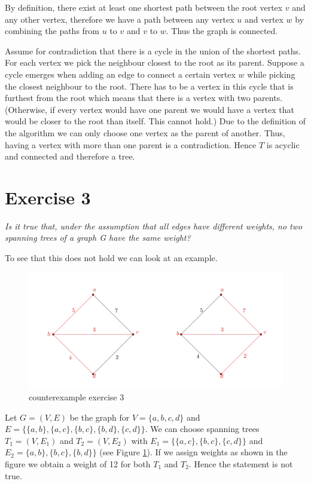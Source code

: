 \documentclass{article}
\begin{document}
By definition, there exist at least one shortest path between the root vertex $v$ and any other vertex, therefore we have a path between any vertex $u$ and vertex $w$ by combining the paths from $u$ to $v$ and $v$ to $w$. Thus the graph is connected.

Assume for contradiction that there is a cycle in the union of the shortest paths. For each vertex we pick the neighbour closest to the root as its parent. Suppose a cycle emerges when adding an edge to connect a certain vertex $w$ while picking the closest neighbour to the root. There has to be a vertex in this cycle that is furthest from the root which means that there is a vertex with two parents. (Otherwise, if every vertex would have one parent we would have a vertex that would be closer to the root than itself. This cannot hold.) Due to the definition of the algorithm we can only choose one vertex as the parent of another. 
Thus, having a vertex with more than one parent is a contradiction. Hence $T$ is acyclic and connected and therefore a tree.

\section*{Exercise 3}

\emph{Is it true that, under the assumption that all edges have different weights, no two spanning trees of a graph G have the same weight?}
\vspace{0.4cm}

To see that this does not hold we can look at an example.

\begin{figure}[h]
    \centering
    \includegraphics{Ex_3_project.png}
       \caption{counterexample exercise 3}
    \label{ex_3}
\end{figure}
Let $G=(V,E)$ be the graph for $V = \{a,b,c,d\}$ and $E = \{ \{a,b\}, \{a,c\}, \{b,c\}, \{b,d\}, \{c,d\} \}$. We can choose spanning trees $T_1 = (V, E_1)$ and $T_2 = (V, E_2)$ with $E_1 = \{ \{a,c\}, \{b,c\}, \{c,d\} \}$ and $E_2=\{a,b\}, \{b,c\}, \{b,d\} \}$ (see Figure \ref{ex_3}). If we assign weights as shown in the figure we obtain a weight of 12 for both $T_1$ and $T_2$. Hence the statement is not true.
\end{document}
